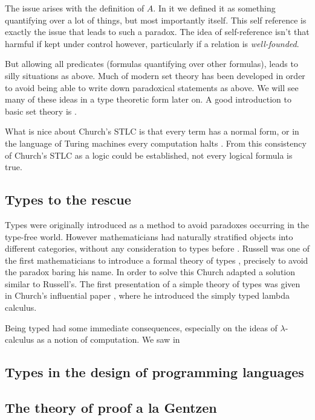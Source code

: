 The issue arises with the definition of $A$. In it we defined it as something quantifying over a lot of things, but most importantly itself. This self reference is exactly the issue that leads to such a paradox. The idea of self-reference isn't that harmful if kept under control however, particularly if a relation is \emph{well-founded}.

But allowing all predicates (formulas quantifying over other formulas), leads to silly situations as above. Much of modern set theory has been developed in order to avoid being able to write down paradoxical statements as above. We will see many of these ideas in a type theoretic form later on. A good introduction to basic set theory is \cite{johnstone1987notes}.


What is nice about Church's STLC is that every term has a normal form, or in the language of Turing machines every computation halts \cite{turing1936a}. From this consistency of Church's STLC as a logic could be established, not every logical formula is true.

\subsection{Types to the rescue}

Types were originally introduced as a method to avoid paradoxes occurring in the type-free world.
However mathematicians had naturally stratified objects into different categories, without any consideration to types before \cite{GANDY1977173, kamareddine2002}.
Russell was one of the first mathematicians to introduce a formal theory of types \cite{GlossarWiki:Whitehead_Russell:1910}, precisely to avoid the paradox baring his name.
In order to solve this Church adapted a solution similar to Russell's.
The first presentation of a simple theory of types was given in Church's influential paper \cite{church1940}, where he introduced the simply typed lambda calculus.

Being typed had some immediate consequences, especially on the ideas of $\lambda$-calculus as a notion of computation. We saw in 

\subsection{Types in the design of programming languages}


\subsection{The theory of proof a la Gentzen}

